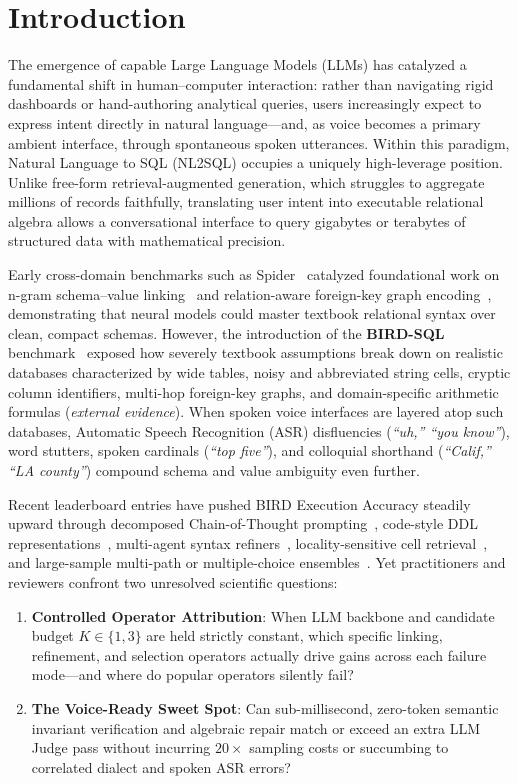 \documentclass[10pt,twocolumn]{article}
\begin{document}
\section{Introduction}

The emergence of capable Large Language Models (LLMs) has catalyzed a fundamental shift in human--computer interaction: rather than navigating rigid dashboards or hand-authoring analytical queries, users increasingly expect to express intent directly in natural language—and, as voice becomes a primary ambient interface, through spontaneous spoken utterances. Within this paradigm, Natural Language to SQL (NL2SQL) occupies a uniquely high-leverage position. Unlike free-form retrieval-augmented generation, which struggles to aggregate millions of records faithfully, translating user intent into executable relational algebra allows a conversational interface to query gigabytes or terabytes of structured data with mathematical precision.

Early cross-domain benchmarks such as Spider~\cite{yu2018spider} catalyzed foundational work on n-gram schema--value linking~\cite{guo2019irnet,lin2020bridge,li2023resdsql} and relation-aware foreign-key graph encoding~\cite{wang2020ratsql}, demonstrating that neural models could master textbook relational syntax over clean, compact schemas. However, the introduction of the \textbf{BIRD-SQL} benchmark~\cite{li2023bird} exposed how severely textbook assumptions break down on realistic databases characterized by wide tables, noisy and abbreviated string cells, cryptic column identifiers, multi-hop foreign-key graphs, and domain-specific arithmetic formulas (\emph{external evidence}). When spoken voice interfaces are layered atop such databases, Automatic Speech Recognition (ASR) disfluencies (\emph{``uh,'' ``you know''}), word stutters, spoken cardinals (\emph{``top five''}), and colloquial shorthand (\emph{``Calif,'' ``LA county''}) compound schema and value ambiguity even further.

Recent leaderboard entries have pushed BIRD Execution Accuracy steadily upward through decomposed Chain-of-Thought prompting~\cite{wei2022cot,pourreza2023dinsql}, code-style DDL representations~\cite{gao2024dailsql}, multi-agent syntax refiners~\cite{wang2025macsql}, locality-sensitive cell retrieval~\cite{talaei2024chess}, and large-sample multi-path or multiple-choice ensembles~\cite{lee2025mcssql,li2024supersql,pourreza2025chasesql}. Yet practitioners and reviewers confront two unresolved scientific questions:
\begin{enumerate}
  \item \textbf{Controlled Operator Attribution}: When LLM backbone and candidate budget $K \in \{1, 3\}$ are held strictly constant, which specific linking, refinement, and selection operators actually drive gains across each failure mode—and where do popular operators silently fail?
  \item \textbf{The Voice-Ready Sweet Spot}: Can sub-millisecond, zero-token semantic invariant verification and algebraic repair match or exceed an extra LLM Judge pass without incurring $20\times$ sampling costs or succumbing to correlated dialect and spoken ASR errors?
\end{enumerate}
\end{document}

